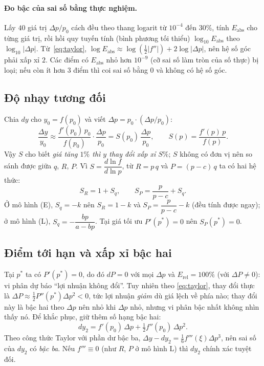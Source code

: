 \paragraph{Đo bậc của sai số bằng thực nghiệm.}
Lấy $40$ giá trị $\Delta p/p_0$ cách đều theo thang logarit từ $10^{-4}$ đến $30\%$, tính
$E_{\mathrm{abs}}$ cho từng giá trị, rồi hồi quy tuyến tính (bình phương tối thiểu)
$\log_{10}E_{\mathrm{abs}}$ theo $\log_{10}|\Delta p|$. Từ~\eqref{eq:taylor},
$\log E_{\mathrm{abs}}\approx \log(\tfrac12|f''|)+2\log|\Delta p|$, nên hệ số góc phải
xấp xỉ $2$. Các điểm có $E_{\mathrm{abs}}$ nhỏ hơn $10^{-9}$ (cỡ sai số làm tròn của số
thực) bị loại; nếu còn ít hơn $3$ điểm thì coi sai số bằng $0$ và không có hệ số góc.

\subsection{Độ nhạy tương đối}
Chia $dy$ cho $y_0=f(p_0)$ và viết $\Delta p=p_0\cdot(\Delta p/p_0)$:
\begin{equation}
\frac{\Delta y}{y_0}\approx \frac{f'(p_0)\,p_0}{f(p_0)}\cdot\frac{\Delta p}{p_0}
= S(p_0)\,\frac{\Delta p}{p_0},
\qquad S(p)=\frac{f'(p)\,p}{f(p)} .
\end{equation}
Vậy $S$ cho biết \emph{giá tăng $1\%$ thì $y$ thay đổi xấp xỉ $S\%$}; $S$ không có đơn vị
nên so sánh được giữa $q$, $R$, $P$. Vì $S=\dfrac{d\ln f}{d\ln p}$, từ $R=p\,q$ và
$P=(p-c)\,q$ ta có hai hệ thức:
\begin{equation}\label{eq:S}
S_R = 1 + S_q, \qquad S_P = \frac{p}{p-c} + S_q .
\end{equation}
Ở mô hình (E), $S_q=-k$ nên $S_R=1-k$ và $S_P=\dfrac{p}{p-c}-k$ (đều tính được ngay);
ở mô hình (L), $S_q=-\dfrac{bp}{a-bp}$. Tại giá tối ưu $P'(p^*)=0$ nên $S_P(p^*)=0$.

\subsection{Điểm tới hạn và xấp xỉ bậc hai}
Tại $p^*$ ta có $P'(p^*)=0$, do đó $dP=0$ với mọi $\Delta p$ và $E_{\mathrm{rel}}=100\%$
(với $\Delta P\neq 0$): vi phân dự báo ``lợi nhuận không đổi''. Tuy nhiên theo
\eqref{eq:taylor}, thay đổi thực là
$\Delta P\approx \tfrac12 P''(p^*)\Delta p^2<0$, tức lợi nhuận \emph{giảm} dù giá lệch về
phía nào; thay đổi này là bậc hai theo $\Delta p$ nên nhỏ khi $\Delta p$ nhỏ, nhưng vi
phân bậc nhất không nhìn thấy nó. Để khắc phục, giữ thêm số hạng bậc hai:
\begin{equation}\label{eq:dy2}
dy_2 = f'(p_0)\,\Delta p + \tfrac12 f''(p_0)\,\Delta p^2 .
\end{equation}
Theo công thức Taylor với phần dư bậc ba, $\Delta y - dy_2=\tfrac16 f'''(\xi)\Delta p^3$,
nên sai số của $dy_2$ có \emph{bậc ba}. Nếu $f'''\equiv 0$ (như $R$, $P$ ở mô hình L)
thì $dy_2$ chính xác tuyệt đối.

